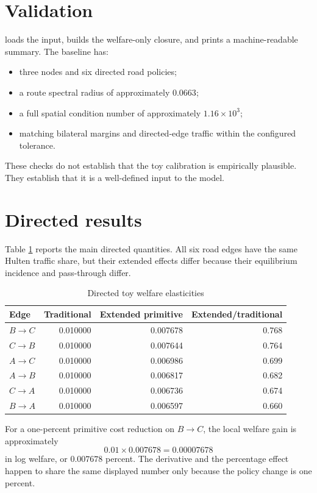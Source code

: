 \section{Validation}

 loads the input, builds the welfare-only closure, and prints a
machine-readable summary. The baseline has:
\begin{itemize}
  \item three nodes and six directed road policies;
  \item a route spectral radius of approximately \(0.0663\);
  \item a full spatial condition number of approximately \(1.16\times10^3\);
  \item matching bilateral margins and directed-edge traffic within the
  configured tolerance.
\end{itemize}

These checks do not establish that the toy calibration is empirically
plausible. They establish that it is a well-defined input to the model.

\section{Directed results}

Table \ref{tab:toy-results} reports the main directed quantities. All six road
edges have the same Hulten traffic share, but their extended effects differ
because their equilibrium incidence and pass-through differ.

\begin{table}[H]
\centering
\caption{Directed toy welfare elasticities}
\label{tab:toy-results}
\begin{tabular}{lrrr}
\toprule
Edge & Traditional & Extended primitive & Extended/traditional \\
\midrule
\(B\to C\) & 0.010000 & 0.007678 & 0.768 \\
\(C\to B\) & 0.010000 & 0.007644 & 0.764 \\
\(A\to C\) & 0.010000 & 0.006986 & 0.699 \\
\(A\to B\) & 0.010000 & 0.006817 & 0.682 \\
\(C\to A\) & 0.010000 & 0.006736 & 0.674 \\
\(B\to A\) & 0.010000 & 0.006597 & 0.660 \\
\bottomrule
\end{tabular}
\end{table}

For a one-percent primitive cost reduction on \(B\to C\), the local welfare
gain is approximately
\[
  0.01\times0.007678=0.00007678
\]
in log welfare, or \(0.007678\) percent. The derivative and the percentage
effect happen to share the same displayed number only because the policy
change is one percent.


